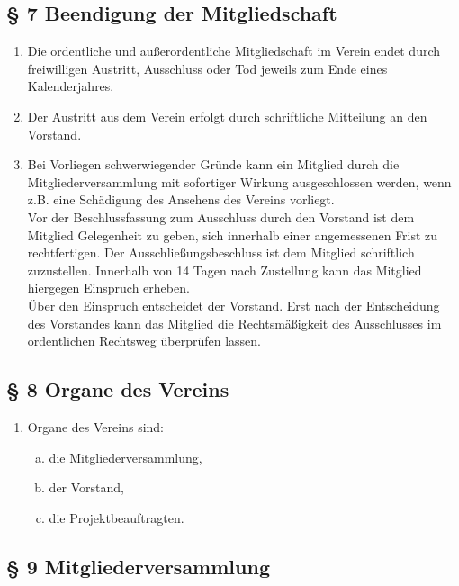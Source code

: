 \documentclass[fontsize=12pt, paper=a4, DIV14, parskip]{scrreprt}
\begin{document}
\subsection{\S{} 7 Beendigung der Mitgliedschaft}

\begin{enumerate}[\qquad(1)]
	\item Die ordentliche und außerordentliche Mitgliedschaft im Verein endet durch freiwilligen Austritt, Ausschluss oder Tod jeweils zum Ende eines Kalenderjahres.
	\item Der Austritt aus dem Verein erfolgt durch schriftliche Mitteilung an den Vorstand.
	\item Bei Vorliegen schwerwiegender Gründe kann ein Mitglied durch die Mitgliederversammlung mit sofortiger Wirkung ausgeschlossen werden, wenn z.B. eine Schädigung des Ansehens des Vereins vorliegt.\\
		Vor der Beschlussfassung zum Ausschluss durch den Vorstand ist dem Mitglied Gelegenheit zu geben, sich innerhalb einer angemessenen Frist zu rechtfertigen. Der Ausschließungsbeschluss ist dem Mitglied schriftlich zuzustellen. Innerhalb von 14 Tagen nach Zustellung kann das Mitglied hiergegen Einspruch erheben.\\
		Über den Einspruch entscheidet der Vorstand. Erst nach der Entscheidung des Vorstandes kann das Mitglied die Rechtsmäßigkeit des Ausschlusses im ordentlichen Rechtsweg überprüfen lassen.
\end{enumerate}

\subsection{\S{} 8 Organe des Vereins}

\begin{enumerate}[\qquad(1)]
	\item Organe des Vereins sind:
	\begin{enumerate}[(a)]\itemsep-12pt
		\item die Mitgliederversammlung,
		\item der Vorstand,
		\item die Projektbeauftragten.
	\end{enumerate}
\end{enumerate}

\subsection{\S{} 9 Mitgliederversammlung}
\end{document}
